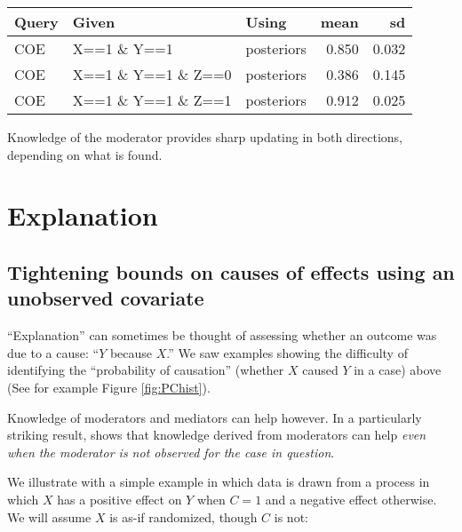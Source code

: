 \documentclass[
  12pt,
]{book}
\newenvironment{Shaded}{\begin{snugshade}}{\end{snugshade}}
\newcommand{\DataTypeTok}[1]{\textcolor[rgb]{0.13,0.29,0.53}{#1}}
\newcommand{\DecValTok}[1]{\textcolor[rgb]{0.00,0.00,0.81}{#1}}
\newcommand{\KeywordTok}[1]{\textcolor[rgb]{0.13,0.29,0.53}{\textbf{#1}}}
\newcommand{\NormalTok}[1]{#1}
\newcommand{\OperatorTok}[1]{\textcolor[rgb]{0.81,0.36,0.00}{\textbf{#1}}}
\newcommand{\OtherTok}[1]{\textcolor[rgb]{0.56,0.35,0.01}{#1}}
\newcommand{\StringTok}[1]{\textcolor[rgb]{0.31,0.60,0.02}{#1}}
\begin{document}
\begin{tabular}{l|l|l|r|r}
\hline
Query & Given & Using & mean & sd\\
\hline
COE & X==1 \& Y==1 & posteriors & 0.850 & 0.032\\
\hline
COE & X==1 \& Y==1 \& Z==0 & posteriors & 0.386 & 0.145\\
\hline
COE & X==1 \& Y==1 \& Z==1 & posteriors & 0.912 & 0.025\\
\hline
\end{tabular}

Knowledge of the moderator provides sharp updating in both directions, depending on what is found.

\hypertarget{explanation}{%
\chapter{Explanation}\label{explanation}}

\hypertarget{tightening-bounds-on-causes-of-effects-using-an-unobserved-covariate}{%
\section{Tightening bounds on causes of effects using an unobserved covariate}\label{tightening-bounds-on-causes-of-effects-using-an-unobserved-covariate}}

``Explanation'' can sometimes be thought of assessing whether an outcome was due to a cause: ``\(Y\) because \(X\).'' We saw examples showing the difficulty of identifying the ``probability of causation'' (whether \(X\) caused \(Y\) in a case) above (See for example Figure \ref{fig:PChist}).

Knowledge of moderators and mediators can help however. In a particularly striking result, \citet{dawid2011role} shows that knowledge derived from moderators can help \emph{even when the moderator is not observed for the case in question}.

We illustrate with a simple example in which data is drawn from a process in which \(X\) has a positive effect on \(Y\) when \(C=1\) and a negative effect otherwise. We will assume \(X\) is as-if randomized, though \(C\) is not:

\begin{Shaded}
\end{Shaded}
\end{document}
